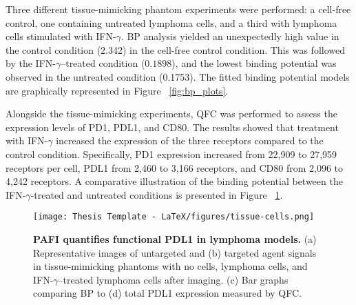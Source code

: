 
Three different tissue-mimicking phantom experiments were performed: a cell-free control, one containing untreated lymphoma cells, and a third with lymphoma cells stimulated with IFN-$\gamma$. BP analysis yielded an unexpectedly high value in the control condition (2.342) in the cell-free control condition. This was followed by the IFN-$\gamma$–treated condition ($0.1898$), and the lowest binding potential was observed in the untreated condition (0.1753). The fitted binding potential models are graphically represented in Figure ~\ref{fig:bp_plots}.
	
Alongside the tissue-mimicking experiments, QFC was performed to assess the expression levels of PD1, PDL1, and CD80. The results showed that treatment with IFN-$\gamma$ increased the expression of the three receptors compared to the control condition. Specifically, PD1 expression increased from 22,909 to 27,959 receptors per cell, PDL1 from 2,460 to 3,166 receptors, and CD80 from 2,096 to 4,242 receptors. A comparative illustration of the binding potential between the IFN-$\gamma$-treated and untreated conditions is presented in Figure ~\ref{fig:tissue-cells}.


\begin{figure}[H]
    \centering
    \begin{minipage}{0.85\linewidth}
        \centering
        \texttt{[image: Thesis Template - LaTeX/figures/tissue-cells.png]}

        \begin{minipage}{0pt}
            \label{fig:tissue-cells_a}
            \label{fig:tissue-cells_b}
        \end{minipage}

        \captionsetup{justification=raggedright, singlelinecheck=false}
        \caption[Binding Potential-Total receptor comparison]{\textbf{PAFI quantifies functional PDL1 in lymphoma models.}
        (a) Representative images of untargeted and (b) targeted agent signals in tissue-mimicking phantoms with no cells, lymphoma cells, and IFN-$\gamma$–treated lymphoma cells after imaging. (c) Bar graphs comparing BP to (d) total PDL1 expression measured by QFC.}
        \label{fig:tissue-cells}
    \end{minipage}
\end{figure}


